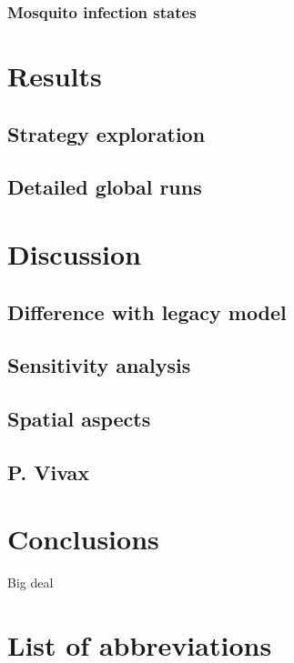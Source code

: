 \documentclass{bmcart}
\begin{document}
\subsubsection*{Mosquito infection states}

\section*{Results}

\subsection*{Strategy exploration}

\subsection*{Detailed global runs}

\section*{Discussion}

\subsection*{Difference with legacy model}

\subsection*{Sensitivity analysis}

\subsection*{Spatial aspects}

\subsection*{P. Vivax}

\section*{Conclusions}

Big deal

\section*{List of abbreviations}
\end{document}
